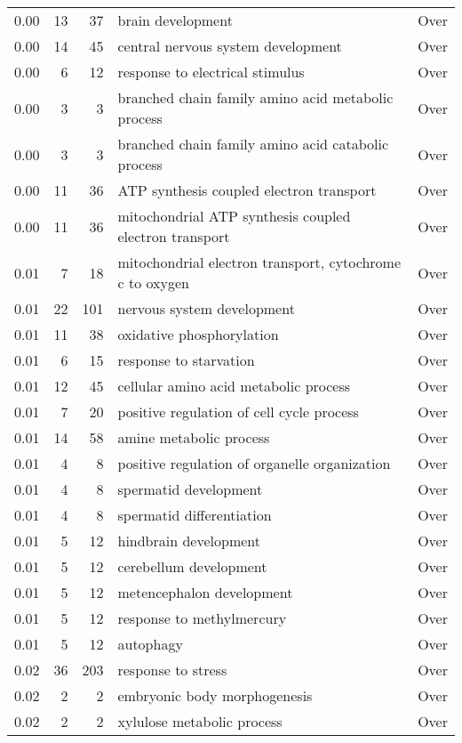 \documentclass[10pt]{bmc_article}
\newenvironment{bmcformat}{\begin{raggedright}\baselineskip20pt\sloppy\setboolean{publ}{false}}{\end{raggedright}\baselineskip20pt\sloppy}
\begin{document}
\begin{bmcformat}
\begin{longtable}{rrrp{7cm}r}
   \hline
0.00 &  13 &  37 & brain development & Over \\ 
  0.00 &  14 &  45 & central nervous system development & Over \\ 
  0.00 &   6 &  12 & response to electrical stimulus & Over \\ 
  0.00 &   3 &   3 & branched chain family amino acid metabolic process & Over \\ 
  0.00 &   3 &   3 & branched chain family amino acid catabolic process & Over \\ 
  0.00 &  11 &  36 & ATP synthesis coupled electron transport & Over \\ 
  0.00 &  11 &  36 & mitochondrial ATP synthesis coupled electron transport & Over \\ 
  0.01 &   7 &  18 & mitochondrial electron transport, cytochrome c to oxygen & Over \\ 
  0.01 &  22 & 101 & nervous system development & Over \\ 
  0.01 &  11 &  38 & oxidative phosphorylation & Over \\ 
  0.01 &   6 &  15 & response to starvation & Over \\ 
  0.01 &  12 &  45 & cellular amino acid metabolic process & Over \\ 
  0.01 &   7 &  20 & positive regulation of cell cycle process & Over \\ 
  0.01 &  14 &  58 & amine metabolic process & Over \\ 
  0.01 &   4 &   8 & positive regulation of organelle organization & Over \\ 
  0.01 &   4 &   8 & spermatid development & Over \\ 
  0.01 &   4 &   8 & spermatid differentiation & Over \\ 
  0.01 &   5 &  12 & hindbrain development & Over \\ 
  0.01 &   5 &  12 & cerebellum development & Over \\ 
  0.01 &   5 &  12 & metencephalon development & Over \\ 
  0.01 &   5 &  12 & response to methylmercury & Over \\ 
  0.01 &   5 &  12 & autophagy & Over \\ 
  0.02 &  36 & 203 & response to stress & Over \\ 
  0.02 &   2 &   2 & embryonic body morphogenesis & Over \\ 
  0.02 &   2 &   2 & xylulose metabolic process & Over \\ 

\end{longtable}
\end{bmcformat}
\end{document}
